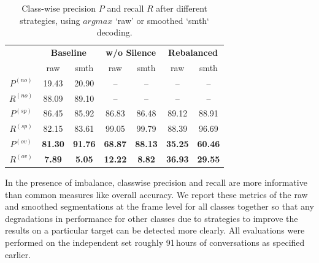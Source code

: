 \documentclass[a4paper]{article}
\begin{document}
\begin{table}[t] \label{tbl:results}
  \caption{Class-wise precision $P$ and recall $R$ after different strategies, using $argmax$ `raw' or smoothed `smth` decoding.}
  \centering
  \begin{tabular}{ccccccc}
    \toprule
                & \multicolumn{2}{c}{\textbf{Baseline}}  & \multicolumn{2}{c}{\textbf{w/o Silence}}   & \multicolumn{2}{c}{\textbf{Rebalanced}}   \\
                &         raw      &         smth        &         raw      &         smth            &         raw      &         smth           \\ \midrule
    $P^{(no)}$  &         19.43    &         20.90       &         --       &         --              &         --       &         --             \\
    $R^{(no)}$  &         88.09    &         89.10       &         --       &         --              &         --       &         --             \\ \midrule
    $P^{(sp)}$  &         86.45    &         85.92       &         86.83    &         86.48           &         89.12    &         88.91          \\
    $R^{(sp)}$  &         82.15    &         83.61       &         99.05    &         99.79           &         88.39    &         96.69          \\ \midrule
    $P^{(ov)}$  & \textbf{81.30}   & \textbf{91.76}      & \textbf{68.87}   & \textbf{88.13}          & \textbf{35.25}   & \textbf{60.46}         \\
    $R^{(ov)}$  & \textbf{ 7.89}   & \textbf{ 5.05}      & \textbf{12.22}   & \textbf{ 8.82}          & \textbf{36.93}   & \textbf{29.55}         \\
    \bottomrule
  \end{tabular}
  \vspace*{-\baselineskip}
\end{table}

In the presence of imbalance, classwise precision and recall are more informative than common measures like overall accuracy.
We report these metrics of the raw and smoothed segmentations at the frame level for all classes together so that any degradations in performance for other classes due to strategies to improve the results on a particular target can be detected more clearly.
All evaluations were performed on the independent set roughly 91\,hours of conversations as specified earlier.
\end{document}
